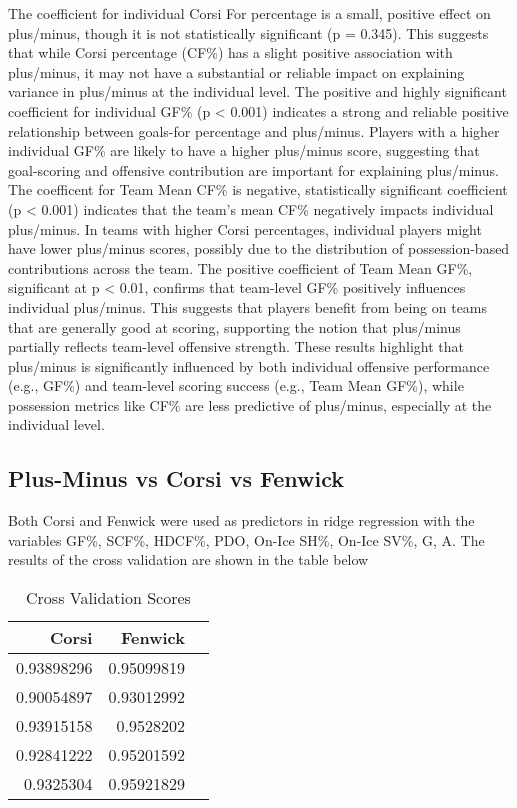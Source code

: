 \documentclass[12pt]{article}
\begin{document}
The coefficient for individual Corsi For percentage is a small, positive effect on plus/minus, though it is not statistically significant 
(p = 0.345). This suggests that while Corsi percentage (CF\%) has a slight positive association with plus/minus, it may not have a 
substantial or reliable impact on explaining variance in plus/minus at the individual level. The positive and highly significant 
coefficient for individual GF\% (p < 0.001) indicates a strong and reliable positive relationship between goals-for percentage and plus/minus. 
Players with a higher individual GF\% are likely to have a higher plus/minus score, suggesting that goal-scoring and offensive contribution 
are important for explaining plus/minus. The coefficent for Team Mean CF\% is negative, statistically significant coefficient (p < 0.001) 
indicates that the team’s mean CF\% negatively impacts individual plus/minus. In teams with higher Corsi percentages, individual players 
might have lower plus/minus scores, possibly due to the distribution of possession-based contributions across the team. The positive 
coefficient of Team Mean GF\%, significant at p < 0.01, confirms that team-level GF\% positively influences individual plus/minus. This 
suggests that players benefit from being on teams that are generally good at scoring, supporting the notion that plus/minus partially 
reflects team-level offensive strength. These results highlight that plus/minus is significantly influenced by both individual offensive 
performance (e.g., GF\%) and team-level scoring success (e.g., Team Mean GF\%), while possession metrics like CF\% are less predictive of 
plus/minus, especially at the individual level.


\subsection{Plus-Minus vs Corsi vs Fenwick}

Both Corsi and Fenwick were used as predictors in ridge regression with the variables GF\%, SCF\%, HDCF\%, PDO, On-Ice SH\%, On-Ice SV\%, G, A.
The results of the cross validation are shown in the table below

\begin{table}[tbp]
  \caption{Cross Validation Scores}
  \label{tab:rv}
\centering
\begin{tabular}{rrr}
  \toprule
Corsi & Fenwick \\ 
  \midrule
  0.93898296 & 0.95099819 \\ 
  0.90054897 & 0.93012992 \\ 
  0.93915158 & 0.9528202 \\ 
  0.92841222 & 0.95201592 \\ 
  0.9325304 & 0.95921829 \\ 
   \bottomrule
\end{tabular}
\end{table}
\end{document}
